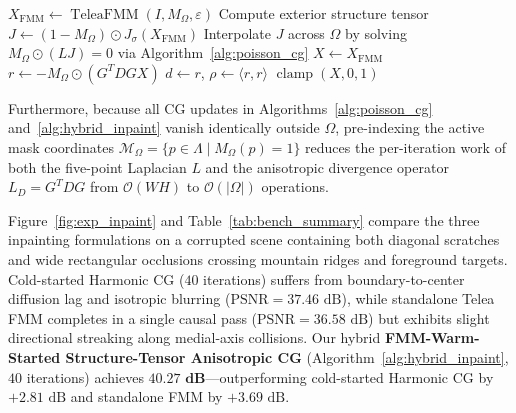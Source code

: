 \documentclass{amsart}
\begin{document}
\begin{algorithm}[H]
\caption{FMM-Warm-Started Structure-Tensor Anisotropic CG Inpainting}\label{alg:hybrid_inpaint}
$X_{\text{FMM}} \gets \operatorname{TeleaFMM}(I, M_\Omega, \varepsilon)$ 
Compute exterior structure tensor $J \gets (1 - M_\Omega) \odot J_\sigma(X_{\text{FMM}})$\;
Interpolate $J$ across $\Omega$ by solving $M_\Omega \odot (L J) = 0$ via Algorithm~\ref{alg:poisson_cg}\;
$X \gets X_{\text{FMM}}$ 
$r \gets -M_\Omega \odot (G^T D G X)$\;
$d \gets r$, \quad $\rho \gets \langle r, r \rangle$\;
\Return $\operatorname{clamp}(X, 0, 1)$
\end{algorithm}

Furthermore, because all CG updates in Algorithms~\ref{alg:poisson_cg} and~\ref{alg:hybrid_inpaint} vanish identically outside $\Omega$, pre-indexing the active mask coordinates $\mathcal{M}_\Omega = \{p \in \Lambda \mid M_\Omega(p) = 1\}$ reduces the per-iteration work of both the five-point Laplacian $L$ and the anisotropic divergence operator $L_D = G^T D G$ from $\mathcal{O}(W H)$ to $\mathcal{O}(|\Omega|)$ operations.

Figure~\ref{fig:exp_inpaint} and Table~\ref{tab:bench_summary} compare the three inpainting formulations on a corrupted scene containing both diagonal scratches and wide rectangular occlusions crossing mountain ridges and foreground targets. Cold-started Harmonic CG ($40$ iterations) suffers from boundary-to-center diffusion lag and isotropic blurring ($\text{PSNR} = 37.46\text{ dB}$), while standalone Telea FMM completes in a single causal pass ($\text{PSNR} = 36.58\text{ dB}$) but exhibits slight directional streaking along medial-axis collisions. Our hybrid \textbf{FMM-Warm-Started Structure-Tensor Anisotropic CG} (Algorithm~\ref{alg:hybrid_inpaint}, $40$ iterations) achieves $\mathbf{40.27\text{ dB}}$---outperforming cold-started Harmonic CG by $+2.81\text{ dB}$ and standalone FMM by $+3.69\text{ dB}$.
\end{document}
